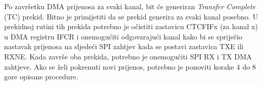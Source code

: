 		Po završetku DMA prijenosa za svaki kanal, bit će generiran \textit{Transfer Complete} (TC) prekid. Bitno je primijetiti da se prekid generira za svaki kanal posebno. U prekidnoj rutini tih prekida potrebno je očistiti zastavicu CTCFIFx (za kanal x) u DMA registru IFCR i onemogućiti odgovarajući kanal kako bi se spriječio nastavak prijenosa na sljedeći SPI zahtjev kada se postavi zastavica TXE ili RXNE. Kada završe oba prekida, potrebno je onemogućiti SPI RX i TX DMA zahtjeve. Ako se želi pokrenuti novi prijenos, potrebno je ponoviti korake 4 do 8 gore opisane procedure.
		
		